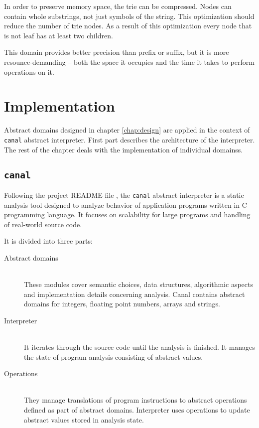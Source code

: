 \documentclass[12pt,final,oneside]{fithesis2}
\theoremstyle{definition}
\begin{document}
In order to preserve memory space, the trie can be compressed. Nodes
can contain whole substrings, not just symbols of the string. This optimization
should reduce the number of trie nodes. As a result of this optimization every
node that is not leaf has at least two children.

This domain provides better precision than prefix or suffix, but it is more
resounce-demanding -- both the space it occupies and the time it takes to perform
operations on it.


\chapter{Implementation}
\label{chap:implementation}

Abstract domains designed in chapter \ref{chap:design} are applied in the
context of \texttt{canal} abstract interpreter. First part describes the architecture of
the interpreter. The rest of the chapter deals with the implementation of individual
domainss.


\section{\texttt{canal}}

Following the project README file \cite{Klic12-1}, the \texttt{canal}
abstract interpreter is a static analysis tool designed to analyze behavior
of application programs written in C programming language. It focuses
on scalability for large programs and handling of real-world source code.

It is divided into three parts:

\begin{description}

\item[Abstract domains] \hfill \\
These modules cover semantic choices, data
structures, algorithmic aspects and implementation details concerning
analysis. Canal contains abstract domains for integers, floating point
numbers, arrays and strings.

\item[Interpreter] \hfill \\
It iterates through the source code until the analysis
is finished. It manages the state of program analysis consisting of
abstract values.

\item[Operations] \hfill \\
They manage translations of program instructions to
abstract operations defined as part of abstract domains. Interpreter uses
operations to update abstract values stored in analysis state.

\end{description}
\end{document}
